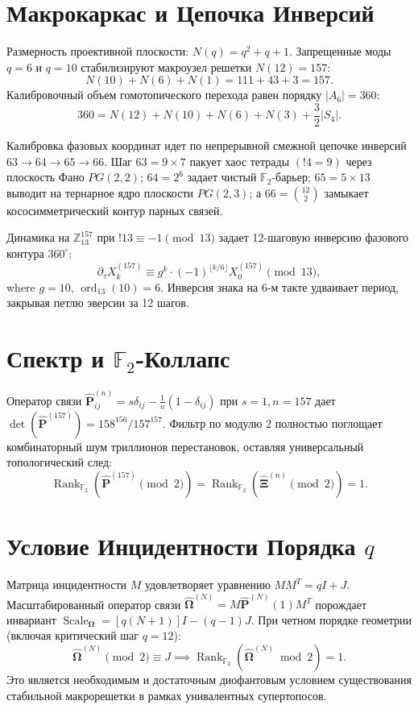 \documentclass[10pt,twocolumn]{article}
\DeclareMathOperator{\Rank}{Rank}
\DeclareMathOperator{\Scale}{Scale}
\DeclareMathOperator{\ord}{ord}
\begin{document}
\section{Макрокаркас и Цепочка Инверсий}
Размерность проективной плоскости: $N(q)=q^2+q+1$. Запрещенные моды $q=6$ и $q=10$ стабилизируют макроузел решетки $N(12)=157$:
\begin{equation}
N(10)+N(6)+N(1)=111+43+3=157.
\end{equation}
Калибровочный объем гомотопического перехода равен порядку $|A_6|=360$:
\begin{equation}
360=N(12)+N(10)+N(6)+N(3)+\frac{3}{2}|S_4|.
\end{equation}

Калибровка фазовых координат идет по непрерывной смежной цепочке инверсий $63\to64\to65\to66$. Шаг $63=9\times7$ пакует хаос тетрады $(!4=9)$ через плоскость Фано $PG({2,2})$; $64=2^6$ задает чистый $\mathbb{F}_2$-барьер; $65=5\times13$ выводит на тернарное ядро плоскости $PG({2,3})$; а $66=\binom{12}{2}$ замыкает кососимметрический контур парных связей.

Динамика на $\mathbb{Z}_{13}^{157}$ при $!13\equiv-1\pmod{13}$ задает 12-шаговую инверсию фазового контура $360^\circ$:
\begin{equation}
\partial_{\tau}X^{(157)}_{k}\equiv g^k\cdot(-1)^{\lfloor k/6\rfloor}X^{(157)}_0\pmod{13},
\end{equation}
where $g=10$, $\ord_{13}(10)=6$. Инверсия знака на 6-м такте удваивает период, закрывая петлю эверсии за 12 шагов.

\section{Спектр и $\mathbb{F}_2$-Коллапс}
Оператор связи $\mathbf{\hat{P}}^{(n)}_{ij}=s\delta_{ij}-\frac{1}{n}(1-\delta_{ij})$ при $s=1,n=157$ дает $\det(\mathbf{\hat{P}}^{(157)})=158^{156}/157^{157}$. Фильтр по модулю 2 полностью поглощает комбинаторный шум триллионов перестановок, оставляя универсальный топологический след:
\begin{equation}
\Rank_{\mathbb{F}_2}(\mathbf{\hat{P}}^{(157)}\pmod2)=\Rank_{\mathbb{F}_2}(\boldsymbol{\hat{\Xi}}^{(n)}\pmod2)=1.
\end{equation}

\section{Условие Инцидентности Порядка $q$}
Матрица инцидентности $M$ удовлетворяет уравнению $MM^T=qI+J$. Масштабированный оператор связи $\boldsymbol{\hat{\Omega}}^{(N)} = M\mathbf{\hat{P}}^{(N)}(1)M^T$ порождает инвариант $\Scale_{\boldsymbol{\Omega}} = [q(N+1)]I-(q-1)J$. При четном порядке геометрии (включая критический шаг $q=12$):
\begin{equation}
\boldsymbol{\hat{\Omega}}^{(N)} \pmod 2 \equiv J \implies \Rank_{\mathbb{F}_2}(\boldsymbol{\hat{\Omega}}^{(N)}\bmod2) = 1.
\end{equation}
Это является необходимым и достаточным диофантовым условием существования стабильной макрорешетки в рамках унивалентных супертопосов.
\end{document}

